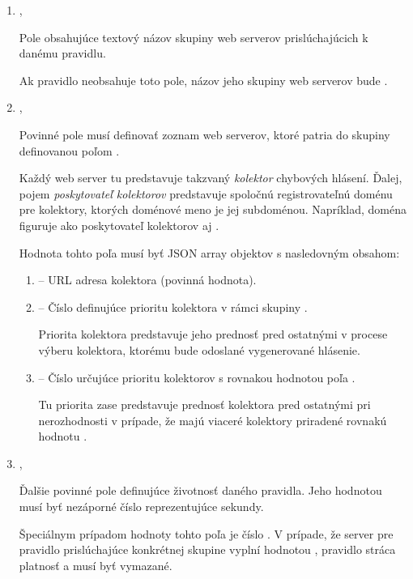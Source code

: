 \begin{enumerate}

    \item {},

    Pole obsahujúce textový názov skupiny web serverov prislúchajúcich k danému pravidlu.
    
    Ak pravidlo neobsahuje toto pole, názov jeho skupiny web serverov bude .
    
    \item {},

    Povinné pole  musí definovať zoznam web serverov, ktoré patria do skupiny definovanou poľom .
    
    Každý web server tu predstavuje takzvaný \emph{kolektor} chybových hlásení.
    Ďalej, pojem \emph{poskytovateľ kolektorov} predstavuje spoločnú registrovateľnú doménu pre kolektory, ktorých doménové meno je jej subdoménou.
    Napríklad, doména  figuruje ako poskytovateľ kolektorov  aj .
    
    Hodnota tohto poľa musí byť JSON array objektov s nasledovným obsahom:
    \begin{enumerate}
        \item {} -- URL adresa kolektora (povinná hodnota).
        \item {} -- Číslo definujúce prioritu kolektora v rámci skupiny .

        Priorita kolektora predstavuje jeho prednosť pred ostatnými v procese výberu kolektora, ktorému bude odoslané vygenerované hlásenie.
        
        \item {} -- Číslo určujúce prioritu kolektorov s rovnakou hodnotou poľa .

        Tu priorita zase predstavuje prednosť kolektora pred ostatnými pri nerozhodnosti v prípade, že majú viaceré kolektory priradené rovnakú hodnotu .
    \end{enumerate}
    
    \item {},

    Ďalšie povinné pole definujúce životnosť daného pravidla. Jeho hodnotou musí byť nezáporné číslo reprezentujúce sekundy.

    Špeciálnym prípadom hodnoty tohto poľa je číslo . 
    V prípade, že server pre pravidlo prislúchajúce konkrétnej skupine  vyplní  hodnotou , pravidlo stráca platnosť a musí byť vymazané.


\end{enumerate}
